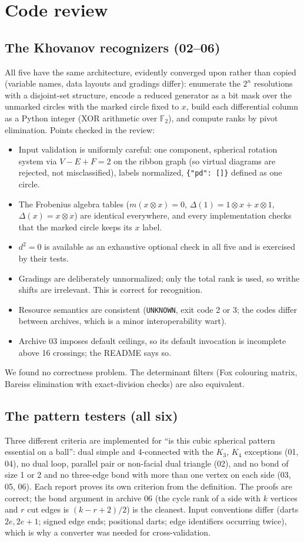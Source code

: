 \documentclass[11pt]{article}
\theoremstyle{remark}
\newcommand{\F}{\mathbb{F}_2}
\newcommand{\code}[1]{\texttt{#1}}
\begin{document}
\section{Code review}

\subsection{The Khovanov recognizers (02--06)}
All five have the same architecture, evidently converged upon rather than
copied (variable names, data layouts and gradings differ): enumerate the
$2^n$ resolutions with a disjoint-set structure, encode a reduced generator as
a bit mask over the unmarked circles with the marked circle fixed to $x$,
build each differential column as a Python integer (XOR arithmetic over
$\F$), and compute ranks by pivot elimination. Points checked in the review:
\begin{itemize}
\item Input validation is uniformly careful: one component, spherical rotation
  system via $V-E+F=2$ on the ribbon graph (so virtual diagrams are rejected,
  not misclassified), labels normalized, \code{\{"pd": []\}} defined as one circle.
\item The Frobenius algebra tables ($m(x\otimes x)=0$, $\Delta(1)=1\otimes x+x\otimes1$,
  $\Delta(x)=x\otimes x$) are identical everywhere, and every implementation
  checks that the marked circle keeps its $x$ label.
\item $d^2=0$ is available as an exhaustive optional check in all five and
  is exercised by their tests.
\item Gradings are deliberately unnormalized; only the total rank is used, so
  writhe shifts are irrelevant. This is correct for recognition.
\item Resource semantics are consistent (\code{UNKNOWN}, exit code 2 or 3;
  the codes differ between archives, which is a minor interoperability wart).
\item Archive 03 imposes default ceilings, so its default invocation is
  incomplete above 16 crossings; the README says so.
\end{itemize}
We found no correctness problem. The determinant filters (Fox colouring
matrix, Bareiss elimination with exact-division checks) are also equivalent.

\subsection{The pattern testers (all six)}
Three different criteria are implemented for ``is this cubic spherical
pattern essential on a ball'': dual simple and 4-connected with the $K_3$,
$K_4$ exceptions (01, 04), no dual loop, parallel pair or non-facial dual
triangle (02), and no bond of size 1 or 2 and no three-edge bond with more
than one vertex on each side (03, 05, 06). Each report proves its own
criterion from the definition. The proofs are correct; the bond argument in
archive 06 (the cycle rank of a side with $k$ vertices and $r$ cut edges is
$(k-r+2)/2$) is the cleanest. Input conventions differ (darts $2e,2e+1$;
signed edge ends; positional darts; edge identifiers occurring twice), which
is why a converter was needed for cross-validation.
\end{document}
